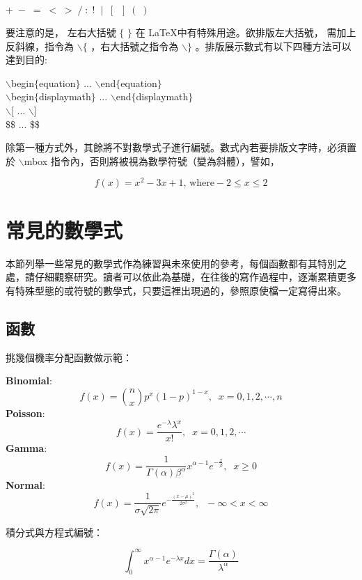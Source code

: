         \begin{center}
         $  + \;-\; =\; <\; > \;/ \;:\; !\;\; |\; \;[\;\; ] \;(\; )$\\
        \end{center}
要注意的是， 左右大括號 $\{$ $\}$ 在 \LaTeX 中有特殊用途。欲排版左大括號， 需加上反斜線，指令為 $\backslash\{$ ，右大括號之指令為 $\backslash\}$ 。排版展示數式有以下四種方法可以達到目的:
        \begin{center}
$\backslash$begin$\{$equation$\}$ ... $\backslash$end$\{$equation$\}$\\
$\backslash$begin$\{$displaymath$\}$ ... $\backslash$end$\{$displaymath$\}$\\
$\backslash$[ ... $\backslash$]\\
\$\$ ... \$\$
        \end{center}
除第一種方式外，其餘將不對數學式子進行編號。數式內若要排版文字時，必須置於 $\backslash$mbox 指令內，否則將被視為數學符號（變為斜體），譬如，

$$f(x)=x^2-3x+1 \mbox{, where}  -2 \leq x \leq 2$$

\section{常見的數學式}
本節列舉一些常見的數學式作為練習與未來使用的參考，每個函數都有其特別之處，請仔細觀察研究。讀者可以依此為基礎，在往後的寫作過程中，逐漸累積更多有特殊型態的或符號的數學式，只要這裡出現過的，參照原使檔一定寫得出來。

\subsection{函數}
挑幾個機率分配函數做示範：

  \noindent \textbf{Binomial}: 
  $$f(x)={n\choose x}p^x(1-p)^{1-x}, \;\; x=0,1,2,\cdots,n$$ 
  \textbf{Poisson}: 
  $$f(x)=\frac{e^{-\lambda}\lambda^x}{x!}, \;\;  x=0,1,2,\cdots$$ 
  \textbf{Gamma}: 
  $$f(x)=\frac{1}{\Gamma(\alpha)\beta^\alpha}x^{\alpha-1}e^{-\frac{x}{\beta}}, \;\; x\geq 0$$
  \textbf{Normal}: 
  $$f(x)=\frac{1}{\sigma\sqrt{2\pi}}e^{-\frac{(x-\mu)^2}{2\sigma^2}}, \;\;  -\infty < x < \infty $$

\bigskip
 積分式與方程式編號：
  
  \begin{equation}\label{gamma}%
  \int^\infty_0 x^{\alpha-1}e^{-\lambda x} dx = \frac{\Gamma(\alpha)}{\lambda^{\alpha}}
  \end{equation}
  
